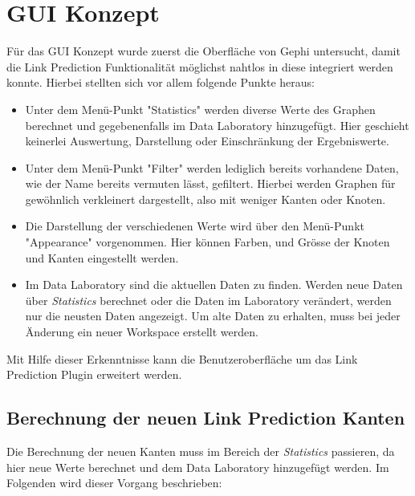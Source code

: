 \section{GUI Konzept}

Für das GUI Konzept wurde zuerst die Oberfläche von Gephi untersucht, damit die Link Prediction Funktionalität möglichst
nahtlos in diese integriert werden konnte. Hierbei stellten sich vor allem folgende Punkte heraus:

\begin{itemize}
    \item Unter dem Menü-Punkt "Statistics" werden diverse Werte des Graphen berechnet und gegebenenfalls im Data Laboratory
          hinzugefügt. Hier geschieht keinerlei Auswertung, Darstellung oder Einschränkung der Ergebniswerte.
    \item Unter dem Menü-Punkt "Filter" werden lediglich bereits vorhandene Daten, wie der Name bereits vermuten lässt,
          gefiltert. Hierbei werden Graphen für gewöhnlich verkleinert dargestellt, also mit weniger Kanten oder Knoten.
    \item Die Darstellung der verschiedenen Werte wird über den Menü-Punkt "Appearance" vorgenommen. Hier können Farben,
          und Grösse der Knoten und Kanten eingestellt werden.
    \item Im Data Laboratory sind die aktuellen Daten zu finden. Werden neue Daten über \textit{Statistics} berechnet
          oder die Daten im Laboratory verändert, werden nur die neusten Daten angezeigt. Um alte Daten zu erhalten,
          muss bei jeder Änderung ein neuer Workspace erstellt werden.
\end{itemize}

Mit Hilfe dieser Erkenntnisse kann die Benutzeroberfläche um das Link Prediction Plugin erweitert werden.

\subsection{Berechnung der neuen Link Prediction Kanten}

Die Berechnung der neuen Kanten muss im Bereich der \textit{Statistics} passieren, da hier neue Werte berechnet und dem
Data Laboratory hinzugefügt werden. Im Folgenden wird dieser Vorgang beschrieben:

